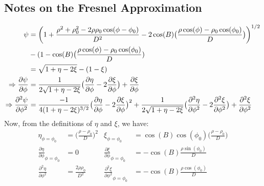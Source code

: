 \documentclass[crop=false,class=book,oneside]{standalone}
\begin{document}
        \subsection{Notes on the Fresnel Approximation}
            \begin{align*}
                \psi
                &=\bigg(
                      1+\frac{%
                          \rho^{2}+\rho_{0}^{2}
                          -2\rho\rho_{0}\cos(\phi-\phi_{0})
                      }{D^{2}}
                      -2\cos(B)\big(
                          \frac{%
                              \rho\cos(\phi)
                              -\rho_{0}\cos(\phi_{0})
                          }{D}
                      \big)
                  \bigg)^{1/2}\\
                &-(1-\cos(B)\big(\frac{\rho\cos(\phi)-\rho_{0}
                  \cos(\phi_{0})}{D})\\
                &=\sqrt{1+\eta-2\xi}-(1-\xi)\\
                  \Rightarrow\frac{\partial\psi}{\partial\phi}
                &=\frac{1}{2\sqrt{1+\eta-2\xi}}
                  \big(
                      \frac{\partial\eta}{\partial\phi}
                      -2\frac{\partial\xi}{\partial\phi}
                  \big)+\frac{\partial\xi}{\partial\phi}\\
                \Rightarrow
                \frac{\partial^{2}\psi}{\partial\phi^{2}}
                &=\frac{-1}{4(1+\eta-2\xi)^{3/2}}
                  \big(
                      \frac{\partial\eta}{\partial\phi}
                      -2\frac{\partial\xi}{\partial\phi}
                  \big)^{2}
                      +\frac{1}{2\sqrt{1+\eta-2\xi}}
                  \big(
                      \frac{\partial^{2}\eta}{\partial\phi^{2}}
                      -2\frac{\partial^{2}\xi}{\partial\phi^{2}}
                  \big)
                +\frac{\partial^{2}\xi}{\partial\phi^{2}}
            \end{align*}
            Now, from the definitions of $\eta$ and $\xi$,
            we have:
            \begin{align*}
                \eta_{\phi=\phi_{0}}
                &=\big(\frac{\rho-\rho_{0}}{D}\big)^{2}
                &
                \xi_{\phi=\phi_{0}}
                &=\cos(B)\cos(\phi_{0})
                  \big(\frac{\rho-\rho_{0}}{D}\big)\\
                \frac{\partial\eta}
                     {\partial\phi}_{\phi=\phi_{0}}
                &=0
                &
                \frac{\partial\xi}
                     {\partial\phi}_{\phi=\phi_{0}}
                &=-\cos(B)\frac{\rho\sin(\phi_{0})}{D}\\
                \frac{\partial^{2}\eta}{\partial\phi^{2}}
                &=\frac{2\rho\rho_{0}}{D^{2}}
                &
                \frac{\partial^{2}\xi}
                     {\partial\phi^{2}}_{\phi=\phi_{0}}
                &=-\cos(B)\frac{\rho\cos(\phi_{0})}{D}
            \end{align*}
\end{document}

